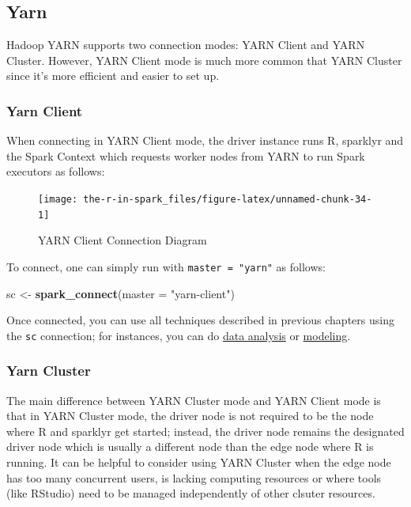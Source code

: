 \documentclass[]{book}
\newenvironment{Shaded}{\begin{snugshade}}{\end{snugshade}}
\newcommand{\DataTypeTok}[1]{\textcolor[rgb]{0.13,0.29,0.53}{#1}}
\newcommand{\KeywordTok}[1]{\textcolor[rgb]{0.13,0.29,0.53}{\textbf{#1}}}
\newcommand{\NormalTok}[1]{#1}
\newcommand{\StringTok}[1]{\textcolor[rgb]{0.31,0.60,0.02}{#1}}
\theoremstyle{definition}
\theoremstyle{definition}
\theoremstyle{definition}
\theoremstyle{remark}
\begin{document}
\hypertarget{yarn-1}{%
\subsection{Yarn}\label{yarn-1}}

Hadoop YARN supports two connection modes: YARN Client and YARN Cluster.
However, YARN Client mode is much more common that YARN Cluster since
it's more efficient and easier to set up.

\hypertarget{yarn-client}{%
\subsubsection{Yarn Client}\label{yarn-client}}

When connecting in YARN Client mode, the driver instance runs R,
sparklyr and the Spark Context which requests worker nodes from YARN to
run Spark executors as follows:

\begin{figure}

{\centering \texttt{[image: the-r-in-spark\_files/figure-latex/unnamed-chunk-34-1]} 

}

\caption{YARN Client Connection Diagram}\label{fig:unnamed-chunk-34}
\end{figure}

To connect, one can simply run with \texttt{master\ =\ "yarn"} as
follows:

\begin{Shaded}
\begin{Highlighting}[]
\NormalTok{sc <-}\StringTok{ }\KeywordTok{spark_connect}\NormalTok{(}\DataTypeTok{master =} \StringTok{"yarn-client"}\NormalTok{)}
\end{Highlighting}
\end{Shaded}

Once connected, you can use all techniques described in previous
chapters using the \texttt{sc} connection; for instances, you can do
\href{analysis}{data analysis} or
\protect\hyperlink{modeling}{modeling}.

\hypertarget{yarn-cluster}{%
\subsubsection{Yarn Cluster}\label{yarn-cluster}}

The main difference between YARN Cluster mode and YARN Client mode is
that in YARN Cluster mode, the driver node is not required to be the
node where R and sparklyr get started; instead, the driver node remains
the designated driver node which is usually a different node than the
edge node where R is running. It can be helpful to consider using YARN
Cluster when the edge node has too many concurrent users, is lacking
computing resources or where tools (like RStudio) need to be managed
independently of other clsuter resources.
\end{document}
